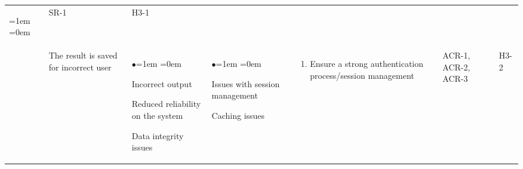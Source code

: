 \documentclass{article}
\begin{document}
\begin{table}[H]
\begin{tabularx}{\textwidth}{|P{2cm}|P{2cm}|P{2cm}|P{2cm}|P{3.45cm}|P{1cm}|P{1cm}|}
\begin{enumerate}[label=(\alph*)]{\leftmargin=1em \itemindent=0em}
        \end{enumerate}
        & SR-1 & H3-1\\
        & The result is saved for incorrect user & 
        \begin{list}{$\bullet$}{\leftmargin=1em \itemindent=0em}
            \item Incorrect output
            \item Reduced reliability on the system
            \item Data integrity issues
        \end{list}
        & 
        \begin{list}{$\bullet$}{\leftmargin=1em \itemindent=0em}
            \item Issues with session management
            \item Caching issues
        \end{list}
        & 
        \begin{enumerate}[label=(\alph*)]{\leftmargin=1em \itemindent=0em}
            \item Ensure a strong authentication process/session management
        \end{enumerate}
        & ACR-1, ACR-2, ACR-3 & H3-2\\
        \hline
    \end{tabularx}
\end{table}
\end{document}
